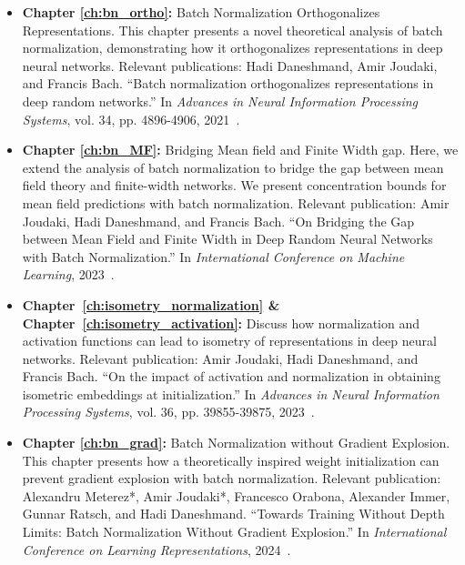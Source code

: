 \begin{itemize}
    
    \item \textbf{Chapter \ref{ch:bn_ortho}:} Batch Normalization Orthogonalizes Representations. 
 This chapter presents a novel theoretical analysis of batch normalization, demonstrating how it orthogonalizes representations in deep neural networks.
 Relevant publications: Hadi Daneshmand, Amir Joudaki, and Francis Bach. ``Batch normalization orthogonalizes representations in deep random networks.'' In \textit{Advances in Neural Information Processing Systems}, vol. 34, pp. 4896-4906, 2021~\cite{daneshmand2021batch}.
    
    \item \textbf{Chapter \ref{ch:bn_MF}:} Bridging Mean field and Finite Width gap. 
 Here, we extend the analysis of batch normalization to bridge the gap between mean field theory and finite-width networks. We present concentration bounds for mean field predictions with batch normalization.
 Relevant publication: Amir Joudaki, Hadi Daneshmand, and Francis Bach. ``On Bridging the Gap between Mean Field and Finite Width in Deep Random Neural Networks with Batch Normalization.'' In \textit{International Conference on Machine Learning}, 2023~\cite{joudaki2023bridging}.
    
    \item \textbf{Chapter~\ref{ch:isometry_normalization} \& Chapter~\ref{ch:isometry_activation}:} Discuss how normalization and activation functions can lead to isometry of representations in deep neural networks.
 Relevant publication: Amir Joudaki, Hadi Daneshmand, and Francis Bach. ``On the impact of activation and normalization in obtaining isometric embeddings at initialization.'' In \textit{Advances in Neural Information Processing Systems}, vol. 36, pp. 39855-39875, 2023~\cite{joudaki2023impact}.
    
    \item \textbf{Chapter \ref{ch:bn_grad}:} Batch Normalization without Gradient Explosion. This chapter presents how a theoretically inspired weight initialization can prevent gradient explosion with batch normalization. Relevant publication: Alexandru Meterez*, Amir Joudaki*, Francesco Orabona, Alexander Immer, Gunnar Ratsch, and Hadi Daneshmand. ``Towards Training Without Depth Limits: Batch Normalization Without Gradient Explosion.'' In \textit{International Conference on Learning Representations}, 2024~\cite{meterez2024towards}.
    

\end{itemize}
